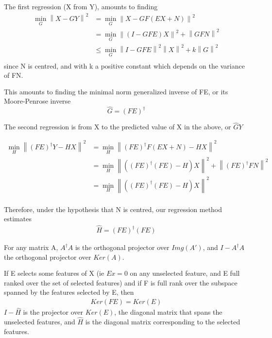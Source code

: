 \documentclass{article}
\begin{document}
The first regression (X from Y), amounts to finding
\begin{equation}
\begin{aligned}
\min_G \left \| X-GY \right \|^2 &= \min_G \left \| X - GF(EX+N)\right\|^2 \\
&{}= \min_G \left \| (I-GFE)X\right\| ^2 + \left \| GFN\right \| ^2\\
&{}\leq \min_G \left \| I-GFE\right\| ^2 \left \| X\right\| ^2 + k\left \| G\right \| ^2\\ 
\end{aligned}
\end{equation}
since N is centred, and with k a positive constant which depends on the variance of FN.

This amounts to finding the minimal norm generalized inverse of FE, or its Moore-Penrose inverse
\begin{equation}
\hat  G= (FE)^{\dagger}
\end{equation}

The second regression is from X to the predicted value of X in the above, or $\hat G  Y$

\begin{equation}
\begin{aligned}
\min_H \left \| (FE)^{\dagger}Y - HX \right \|^2 &= \min_H \left \| (FE)^{\dagger}F(EX+N) - HX \right \|^2 \\
&= \min_H \left \| ((FE)^{\dagger}(FE)-H)X \right \| ^2 + \left \| (FE)^{\dagger}FN \right \| ^2\\
&= \min_H \left \| ((FE)^{\dagger}(FE)-H)X \right \| ^2\\
\end{aligned}
\end{equation}

Therefore, under the hypothesis that N is centred, our regression method estimates 
\begin{equation}
\begin{aligned}
\hat H =(FE)^{\dagger}(FE)
\end{aligned}
\end{equation}

For any matrix A, $A^\dagger A$ is the orthogonal projector over $Img(A')$, and $I-A^\dagger A$ the orthogonal projector over $Ker(A)$. 

If E selects some features of X (ie $Ex=0$ on any unselected feature, and E full ranked over the set of selected features) and if F is full rank over the subspace spanned by the features selected by E, then 
\begin{equation}
\begin{aligned}
Ker(FE) = Ker(E)  
\end{aligned}
\end{equation}
$I - \hat H$ is the projector over $Ker(E)$, the diagonal matrix that spans the unselected features, and $\hat H$ is the diagonal matrix corresponding to the selected features.
\end{document}
